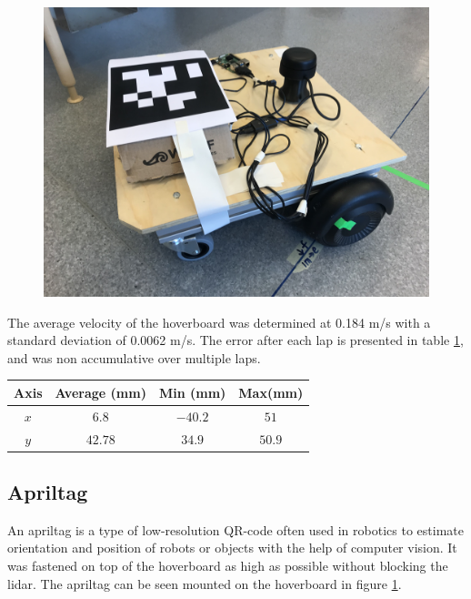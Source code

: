 \documentclass[nofilelist]{cslthse-msc}
\begin{document}
\begin{figure}[!hbt]
   \centering
   \includegraphics[scale=0.07]{images/hoverboard.jpg} 
   \caption{}
   \label{fig:hoverboard}
\end{figure}

The average velocity of the hoverboard was determined at 0.184 m/s with a standard deviation of 0.0062 m/s. The error after each lap is presented in table \ref{tab:hoverboard-error}, and was non accumulative over multiple laps. 

\begin{table}[!hbt]
   \centering
   \label{tab:hoverboard-error}
   \begin{tabular}{|c|c|c|c|}
      \hline
      \textbf{Axis} & \textbf{Average (mm)} & \textbf{Min (mm)} & \textbf{Max(mm)} \\
      \hline
      $x$ & $6.8 $ & $-40.2$ & $51$ \\
      \hline
      $y$ & $42.78$ & $34.9$ & $50.9$ \\
      \hline
   \end{tabular}
\end{table}

\subsection{Apriltag}
An apriltag is a type of low-resolution QR-code often used in robotics to estimate orientation and position of robots or objects with the help of computer vision. It was fastened on top of the hoverboard as high as possible without blocking the lidar. The apriltag can be seen mounted on the hoverboard in figure \ref{fig:hoverboard}.
\end{document}
